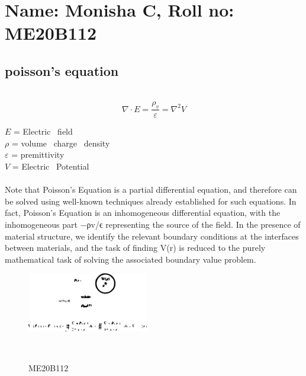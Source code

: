 
\section{Name: Monisha C, Roll no: ME20B112}
\subsection{poisson's equation}~\cite{poisson's}
\begin{equation}
\nabla \cdot E = \frac{\rho_v}{\varepsilon} = \nabla^2 V
\end {equation}
\begin{flushleft}
$E$ = Electric \ field \\
$\rho$ = volume \ charge \ density \\
$\varepsilon$ = premittivity\\
$V$ = Electric \ Potential
\end{flushleft}

\paragraph{}
Note that Poisson’s Equation is a partial differential equation, and therefore can be solved using well-known techniques already established for such equations. In fact, Poisson’s Equation is an inhomogeneous differential equation, with the inhomogeneous part  −ρv/ϵ  representing the source of the field. In the presence of material structure, we identify the relevant boundary conditions at the interfaces between materials, and the task of finding  V(r)  is reduced to the purely mathematical task of solving the associated boundary value problem.


\begin{figure}[h]
\begin{center}
\includegraphics[width=200px]{ME20B112.eps}
\caption{ME20B112}~\cite{me20b112}
\label{fig:poisson}
\end{center}
\end{figure}


